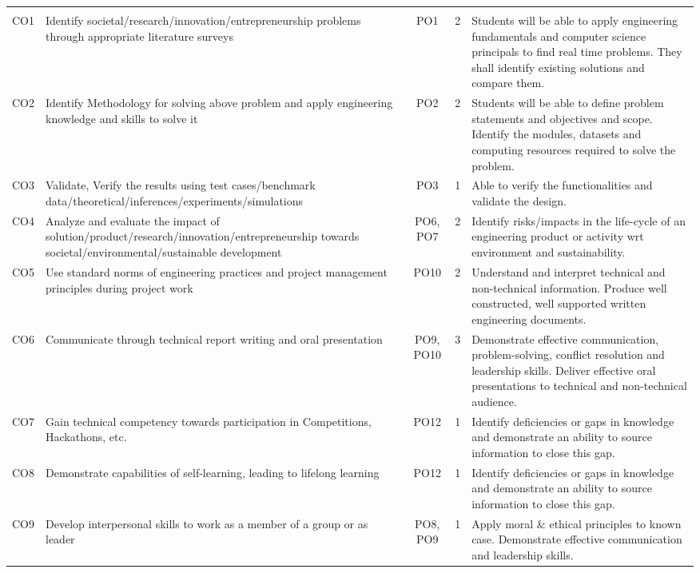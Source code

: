 \documentclass[12pt,a4paper]{article}
\begin{document}
\begin{longtable}{|c|p{4cm}|c|c|p{6cm}|}
\hline
\rowcolor{headercolor}
\color{white}{\textbf{CO}} & \color{white}{\textbf{CO Statements}} & \color{white}{\textbf{PO}} & \color{white}{\textbf{Level}} & \color{white}{\textbf{Justification}} \\
\hline
\endfirsthead
\hline
\rowcolor{headercolor}
\color{white}{\textbf{CO}} & \color{white}{\textbf{CO Statements}} & \color{white}{\textbf{PO}} & \color{white}{\textbf{Level}} & \color{white}{\textbf{Justification}} \\
\hline
\endhead
\hline
\endfoot
\endlastfoot

CO1 & Identify societal/research/innovation/entrepreneurship problems through appropriate literature surveys & PO1 & 2 & Students will be able to apply engineering fundamentals and computer science principals to find real time problems. They shall identify existing solutions and compare them. \\
\hline
CO2 & Identify Methodology for solving above problem and apply engineering knowledge and skills to solve it & PO2 & 2 & Students will be able to define problem statements and objectives and scope. Identify the modules, datasets and computing resources required to solve the problem. \\
\hline
CO3 & Validate, Verify the results using test cases/benchmark data/theoretical/inferences/experiments/simulations & PO3 & 1 & Able to verify the functionalities and validate the design. \\
\hline
CO4 & Analyze and evaluate the impact of solution/product/research/innovation/entrepreneurship towards societal/environmental/sustainable development & PO6, PO7 & 2 & Identify risks/impacts in the life-cycle of an engineering product or activity wrt environment and sustainability. \\
\hline
CO5 & Use standard norms of engineering practices and project management principles during project work & PO10 & 2 & Understand and interpret technical and non-technical information. Produce well constructed, well supported written engineering documents. \\
\hline
CO6 & Communicate through technical report writing and oral presentation & PO9, PO10 & 3 & Demonstrate effective communication, problem-solving, conflict resolution and leadership skills. Deliver effective oral presentations to technical and non-technical audience. \\
\hline
CO7 & Gain technical competency towards participation in Competitions, Hackathons, etc. & PO12 & 1 & Identify deficiencies or gaps in knowledge and demonstrate an ability to source information to close this gap. \\
\hline
CO8 & Demonstrate capabilities of self-learning, leading to lifelong learning & PO12 & 1 & Identify deficiencies or gaps in knowledge and demonstrate an ability to source information to close this gap. \\
\hline
CO9 & Develop interpersonal skills to work as a member of a group or as leader & PO8, PO9 & 1 & Apply moral \& ethical principles to known case. Demonstrate effective communication and leadership skills. \\
\hline
\end{longtable}
\end{document}
